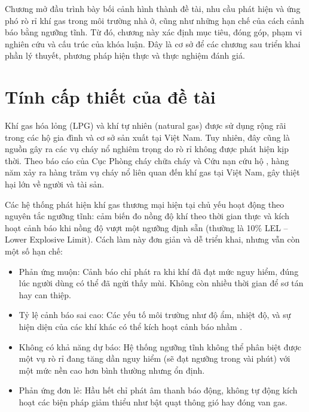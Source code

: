 
Chương mở đầu trình bày bối cảnh hình thành đề tài, nhu cầu phát hiện và ứng phó rò rỉ khí gas trong môi trường nhà ở, cũng như những hạn chế của cách cảnh báo bằng ngưỡng tĩnh. Từ đó, chương này xác định mục tiêu, đóng góp, phạm vi nghiên cứu và cấu trúc của khóa luận. Đây là cơ sở để các chương sau triển khai phần lý thuyết, phương pháp hiện thực và thực nghiệm đánh giá.

\section{Tính cấp thiết của đề tài}

Khí gas hóa lỏng (LPG) và khí tự nhiên (natural gas) được sử dụng rộng rãi trong các hộ gia đình và cơ sở sản xuất tại Việt Nam. Tuy nhiên, đây cũng là nguồn gây ra các vụ cháy nổ nghiêm trọng do rò rỉ không được phát hiện kịp thời. Theo báo cáo của Cục Phòng cháy chữa cháy và Cứu nạn cứu hộ \cite{pccc2023}, hàng năm xảy ra hàng trăm vụ cháy nổ liên quan đến khí gas tại Việt Nam, gây thiệt hại lớn về người và tài sản.

Các hệ thống phát hiện khí gas thương mại hiện tại chủ yếu hoạt động theo nguyên tắc ngưỡng tĩnh: cảm biến đo nồng độ khí theo thời gian thực và kích hoạt cảnh báo khi nồng độ vượt một ngưỡng định sẵn (thường là 10\% LEL – Lower Explosive Limit). Cách làm này đơn giản và dễ triển khai, nhưng vẫn còn một số hạn chế:

\begin{itemize}
  \item Phản ứng muộn: Cảnh báo chỉ phát ra khi khí đã đạt mức nguy hiểm, đúng lúc người dùng có thể đã ngửi thấy mùi. Không còn nhiều thời gian để sơ tán hay can thiệp.
  \item Tỷ lệ cảnh báo sai cao: Các yếu tố môi trường như độ ẩm, nhiệt độ, và sự hiện diện của các khí khác có thể kích hoạt cảnh báo nhầm \cite{tian2019}.
  \item Không có khả năng dự báo: Hệ thống ngưỡng tĩnh không thể phân biệt được một vụ rò rỉ đang tăng dần nguy hiểm (sẽ đạt ngưỡng trong vài phút) với một mức nền cao hơn bình thường nhưng ổn định.
  \item Phản ứng đơn lẻ: Hầu hết chỉ phát âm thanh báo động, không tự động kích hoạt các biện pháp giảm thiểu như bật quạt thông gió hay đóng van gas.
\end{itemize}

